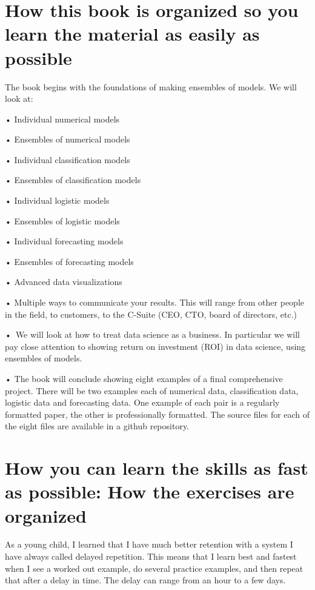\documentclass[
]{book}
\begin{document}
\section{How this book is organized so you learn the material as easily as possible}\label{how-this-book-is-organized-so-you-learn-the-material-as-easily-as-possible}

The book begins with the foundations of making ensembles of models. We will look at:

• Individual numerical models

• Ensembles of numerical models

• Individual classification models

• Ensembles of classification models

• Individual logistic models

• Ensembles of logistic models

• Individual forecasting models

• Ensembles of forecasting models

• Advanced data visualizations

• Multiple ways to communicate your results. This will range from other people in the field, to customers, to the C-Suite (CEO, CTO, board of directors, etc.)

•~We will look at how to treat data science as a business. In particular we will pay close attention to showing return on investment (ROI) in data science, using ensembles of models.

• The book will conclude showing eight examples of a final comprehensive project. There will be two examples each of numerical data, classification data, logistic data and forecasting data. One example of each pair is a regularly formatted paper, the other is professionally formatted. The source files for each of the eight files are available in a github repository.

\section{How you can learn the skills as fast as possible: How the exercises are organized}\label{how-you-can-learn-the-skills-as-fast-as-possible-how-the-exercises-are-organized}

As a young child, I learned that I have much better retention with a system I have always called delayed repetition. This means that I learn best and fastest when I see a worked out example, do several practice examples, and then repeat that after a delay in time. The delay can range from an hour to a few days.
\end{document}
